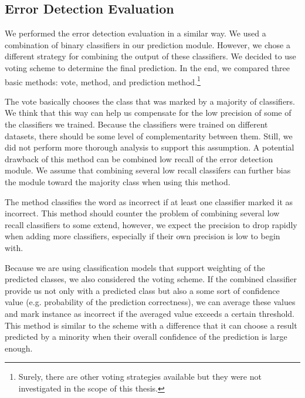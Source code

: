 \subsection{Error Detection Evaluation}

We performed the error detection evaluation in a similar way. We used a combination
of binary classifiers in our prediction module. However, we chose a different strategy
for combining the output of these classifiers.
We decided to use voting scheme to determine the final prediction.
In the end, we compared three basic methods:  vote,  method,
and  prediction method.\footnote{Surely, there are other voting strategies available
but they were not investigated in the scope of this thesis.}

The  vote basically chooses the class that was marked by a majority of classifiers.
We think that this way can help us compensate for the low precision of some of the classifiers we trained.
Because the classifiers were trained on different datasets, there should be some level of complementarity
between them. Still, we did not perform more thorough analysis to support this assumption.
A potential drawback of this method can be combined low recall of the error detection module. We assume that
combining several low recall classifers can further bias the module toward the majority class when using
this method.

The  method classifies the word as incorrect if at least one classifier marked it
as incorrect. This method should counter the problem of combining several low recall classifiers to some
extend, however, we expect the precision to drop rapidly when adding more classifiers, especially if their own
precision is low to begin with.

Because we are using classification models that support weighting of the predicted classes, we
also considered the  voting scheme. If the combined classifier provide us not only with
a predicted class but also a some sort of confidence value (e.g. probability of the prediction correctness),
we can average these values and mark instance as incorrect if the averaged value exceeds a certain threshold.
This method is similar to the  scheme with a difference that it can choose a result
predicted by a minority when their overall confidence of the prediction is large enough.

